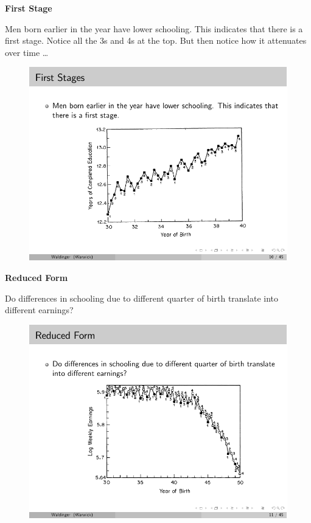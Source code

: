 \documentclass[notes=show]{beamer}
\begin{document}
\begin{frame}[plain]

	\begin{center}
	\textbf{First Stage}
	\end{center}
	
	 Men born earlier in the year have lower schooling. This indicates that there is a first stage. Notice all the 3s and 4s at the top. But then notice how it attenuates over time \dots
	
	\begin{figure}
	\includegraphics{./lecture_includes/qob_2.pdf}
	\end{figure}
	
\end{frame}


\begin{frame}[plain]

	\begin{center}
	\textbf{Reduced Form}
	\end{center}
	
	 Do differences in schooling due to different quarter of birth translate into different earnings?
	
	\begin{figure}
	\includegraphics{./lecture_includes/qob_3.pdf}
	\end{figure}
	
\end{frame}
\end{document}
